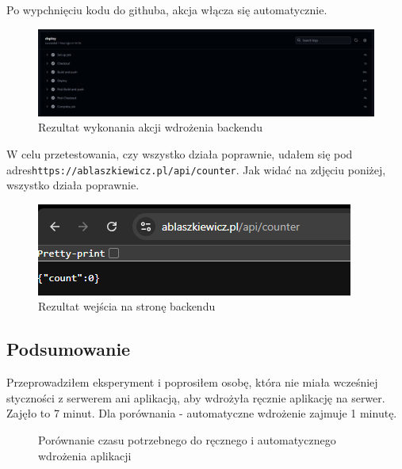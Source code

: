 \documentclass{article}
\begin{document}
Po wypchnięciu kodu do githuba, akcja włącza się automatycznie.

\begin{figure}[H]
    \centering
    \includegraphics[width=1\linewidth]{pierwszaAkcjaBackendu.png}
    \caption{Rezultat wykonania akcji wdrożenia backendu}
    \label{fig:enter-label}
\end{figure}

W celu przetestowania, czy wszystko działa poprawnie, udałem się pod adres\lstinline|https://ablaszkiewicz.pl/api/counter|. Jak widać na zdjęciu poniżej, wszystko działa poprawnie.

\begin{figure}[H]
    \centering
    \includegraphics[width=1\linewidth]{rezultatPierwszejWizytyPodBackend.png}
    \caption{Rezultat wejścia na stronę backendu}
    \label{fig:enter-label}
\end{figure}

\subsection{Podsumowanie}

Przeprowadziłem eksperyment i poprosiłem osobę, która nie miała wcześniej styczności z serwerem ani aplikacją, aby wdrożyła ręcznie aplikację na serwer. Zajęło to 7 minut. Dla porównania - automatyczne wdrożenie zajmuje 1 minutę.

\begin{figure}[H]
\centering
{}
\caption{Porównanie czasu potrzebnego do ręcznego i automatycznego wdrożenia aplikacji}
\label{fig:czas_wdrozenia}
\end{figure}
\end{document}
